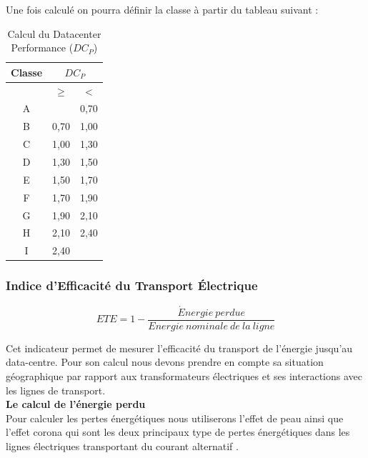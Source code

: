 Une fois calculé on pourra définir la classe à partir du tableau suivant : \\
\begin{table}[h]
	\begin{center}
		\setlength{\tabcolsep}{2em}
		\begin{tabular}{|c|c|c|}
			\hline
			Classe & \multicolumn{2}{c|}{$DC_P$} \\
			\hline
			& $\geq$ & $<$ \\
			\hline
			\cellcolor[HTML]{329965}A & & 0,70 \\
			\hline
			\cellcolor[HTML]{00CC00}B & 0,70 & 1,00 \\
			\hline
			\cellcolor[HTML]{CCFF65}C & 1,00 & 1,30 \\
			\hline
			\cellcolor{yellow}D & 1,30 & 1,50 \\
			\hline
			\cellcolor[HTML]{FFCC00}E & 1,50 & 1,70 \\
			\hline
			\cellcolor[HTML]{FF9900}F & 1,70 & 1,90 \\
			\hline
			\cellcolor{red}G & 1,90 & 2,10 \\
			\hline
			\cellcolor[HTML]{7F7F7F}H & 2,10 & 2,40 \\
			\hline
			\cellcolor[HTML]{323232}\color{white}I & 2,40 & \\
			\hline
		\end{tabular}
		\caption{Calcul du Datacenter Performance ($DC_P$)}
	\end{center}
\end{table}

\subsubsection{Indice d'Efficacité du Transport Électrique}
\[ETE=1-\frac{\acute{E}nergie\ perdue}{Energie\ nominale\ de\ la\ ligne}\]

Cet indicateur permet de mesurer l'efficacité du transport de l'énergie jusqu'au data-centre. Pour son calcul nous devons prendre en compte sa situation géographique par rapport aux transformateurs électriques et ses interactions avec les lignes de transport.\\

\textbf{Le calcul de l'énergie perdu}\\
Pour calculer les pertes énergétiques nous utiliserons l'effet de peau \cite{EffetPeau} ainsi que l'effet corona \cite{Corona} qui sont les deux principaux type de pertes énergétiques dans les lignes électriques transportant du courant alternatif \cite{ACLosses}. 

